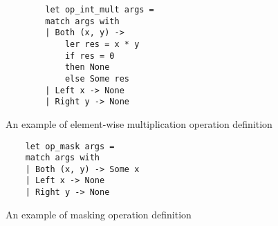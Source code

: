 \begin{listing}[h]
        \begin{verbatim}
        let op_int_mult args =
        match args with
        | Both (x, y) -> 
            ler res = x * y 
            if res = 0 
            then None 
            else Some res 
        | Left x -> None
        | Right y -> None
        \end{verbatim}
        \caption{An example of element-wise multiplication operation definition}
        \label{lst:opIntMult}
\end{listing}

\begin{listing}[h]
    \begin{verbatim}
    let op_mask args =
    match args with
    | Both (x, y) -> Some x
    | Left x -> None
    | Right y -> None
    \end{verbatim}
    \caption{An example of masking operation definition}
    \label{lst:opMask}
\end{listing}
